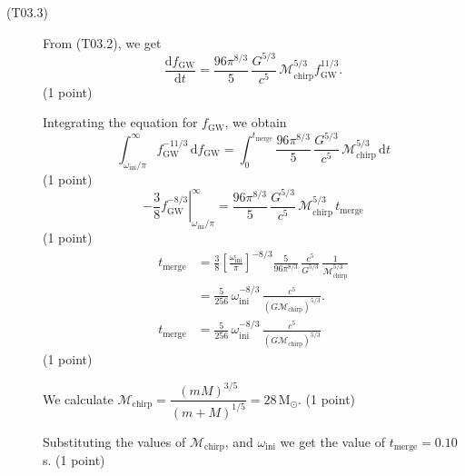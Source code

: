 \begin{description}
\item[(T03.3)] From (T03.2), we get
  \[ \frac{\mathrm{d}f_{\mathrm{GW}}}{\mathrm{d}t}
     = \frac{96\pi^{8/3}}{5}\,\frac{G^{5/3}}{c^5}\,
       \mathcal{M}_{\mathrm{chirp}}^{5/3} f_{\mathrm{GW}}^{11/3}. \]
  \hfill(1 point)

  Integrating the equation for $f_{\mathrm{GW}}$, we obtain
  \[ \int_{\omega_{\mathrm{ini}}/\pi}^{\infty}
     f_{\mathrm{GW}}^{-11/3}\,\mathrm{d}f_{\mathrm{GW}}
     = \int_{0}^{t_{\mathrm{merge}}} \frac{96\pi^{8/3}}{5}\,
       \frac{G^{5/3}}{c^5}\,\mathcal{M}_{\mathrm{chirp}}^{5/3}\,\mathrm{d}t \]
  \hfill(1 point)
  \[ \left.-\frac{3}{8} f_{\mathrm{GW}}^{-8/3}
     \right|_{\omega_{\mathrm{ini}}/\pi}^{\infty}
     = \frac{96\pi^{8/3}}{5}\,\frac{G^{5/3}}{c^5}\,
       \mathcal{M}_{\mathrm{chirp}}^{5/3}\,t_{\mathrm{merge}} \]
  \hfill(1 point)
  \begin{align*}
    t_{\mathrm{merge}}
      &= \frac{3}{8}\left[\frac{\omega_{\mathrm{ini}}}{\pi}\right]^{-8/3}
         \frac{5}{96\pi^{8/3}}\,\frac{c^5}{G^{5/3}}\,
         \frac{1}{\mathcal{M}_{\mathrm{chirp}}^{5/3}} \\
      &= \frac{5}{256}\,\omega_{\mathrm{ini}}^{-8/3}\,
         \frac{c^5}{(G\mathcal{M}_{\mathrm{chirp}})^{5/3}}. \\
    t_{\mathrm{merge}}
      &= \frac{5}{256}\,\omega_{\mathrm{ini}}^{-8/3}\,
         \frac{c^5}{(G\mathcal{M}_{\mathrm{chirp}})^{5/3}}
  \end{align*}
  \hfill(1 point)

  We calculate
  $\mathcal{M}_{\mathrm{chirp}} = \dfrac{(mM)^{3/5}}{(m+M)^{1/5}}
   = 28\,\mathrm{M}_\odot$. \hfill(1 point)

  Substituting the values of $\mathcal{M}_{\mathrm{chirp}}$, and
  $\omega_{\mathrm{ini}}$ we get the value of
  $t_{\mathrm{merge}} = 0.10$\,s. \hfill(1 point)
\end{description}


